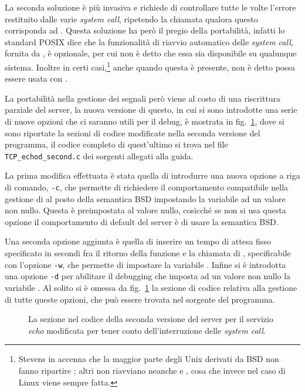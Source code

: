 La seconda soluzione è più invasiva e richiede di controllare tutte le volte
l'errore restituito dalle varie \textit{system call}, ripetendo la chiamata
qualora questo corrisponda ad . Questa soluzione ha però il
pregio della portabilità, infatti lo standard POSIX dice che la funzionalità
di riavvio automatico delle \textit{system call}, fornita da
, è opzionale, per cui non è detto che essa sia disponibile
su qualunque sistema.  Inoltre in certi casi,\footnote{Stevens in \cite{UNP1}
  accenna che la maggior parte degli Unix derivati da BSD non fanno ripartire
  ; altri non riavviano neanche  e ,
  cosa che invece nel caso di Linux viene sempre fatta.} anche quando questa è
presente, non è detto possa essere usata con .

La portabilità nella gestione dei segnali però viene al costo di una
riscrittura parziale del server, la nuova versione di questo, in cui si sono
introdotte una serie di nuove opzioni che ci saranno utili per il debug, è
mostrata in fig.~\ref{fig:TCP_echo_server_code_second}, dove si sono riportate
la sezioni di codice modificate nella seconda versione del programma, il
codice completo di quest'ultimo si trova nel file
\texttt{TCP\_echod\_second.c} dei sorgenti allegati alla guida.

La prima modifica effettuata è stata quella di introdurre una nuova opzione a
riga di comando, \texttt{-c}, che permette di richiedere il comportamento
compatibile nella gestione di  al posto della semantica BSD
impostando la variabile  ad un valore non nullo. Questa è
preimpostata al valore nullo, cosicché se non si usa questa opzione il
comportamento di default del server è di usare la semantica BSD. 

Una seconda opzione aggiunta è quella di inserire un tempo di attesa fisso
specificato in secondi fra il ritorno della funzione  e la
chiamata di , specificabile con l'opzione \texttt{-w}, che
permette di impostare la variabile .  Infine si è introdotta una
opzione \texttt{-d} per abilitare il debugging che imposta ad un valore non
nullo la variabile . Al solito si è omessa da
fig.~\ref{fig:TCP_echo_server_code_second} la sezione di codice relativa alla
gestione di tutte queste opzioni, che può essere trovata nel sorgente del
programma.

\begin{figure}[!htb ]
  \footnotesize \centering
  \begin{minipage}[c]{\codesamplewidth}
  \end{minipage} 
  \normalsize
  \caption{La sezione nel codice della seconda versione del server
    per il servizio \textit{echo} modificata per tener conto dell'interruzione
    delle \textit{system call}.}
  \label{fig:TCP_echo_server_code_second}
\end{figure}

